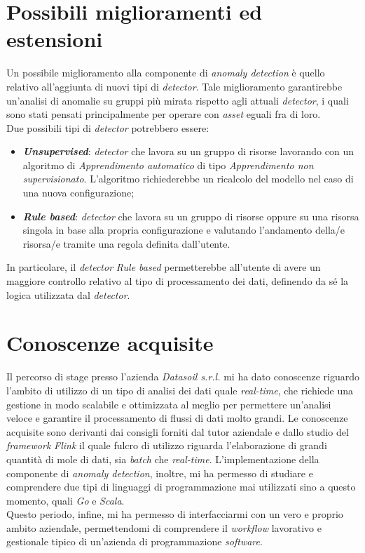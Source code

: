 \section{Possibili miglioramenti ed estensioni}
Un possibile miglioramento alla componente di \textit{anomaly detection} è quello relativo all'aggiunta di nuovi tipi di \textit{detector}. Tale miglioramento garantirebbe un'analisi di anomalie su gruppi più mirata rispetto agli attuali \textit{detector}, i quali sono stati pensati principalmente per operare con \textit{asset} eguali fra di loro.\\
Due possibili tipi di \textit{detector} potrebbero essere:
\begin{itemize}
	\item{\textbf{\textit{Unsupervised}}: \textit{detector} che lavora su un gruppo di risorse lavorando con un algoritmo di \textit{\gls{Apprendimento automatico}} di tipo \textit{\gls{Apprendimento non supervisionato}}. L'algoritmo richiederebbe un ricalcolo del modello nel caso di una nuova configurazione;}
	\item{\textbf{\textit{Rule based}}: \textit{detector} che lavora su un gruppo di risorse oppure su una risorsa singola in base alla propria configurazione e valutando l'andamento della/e risorsa/e tramite una regola definita dall'utente.}
\end{itemize}
In particolare, il \textit{detector} \textit{Rule based} permetterebbe all'utente di avere un maggiore controllo relativo al tipo di processamento dei dati, definendo da sé la logica utilizzata dal \textit{detector}.



\section{Conoscenze acquisite}
Il percorso di stage presso l'azienda \textit{Datasoil s.r.l.} mi ha dato conoscenze riguardo l'ambito di utilizzo di un tipo di analisi dei dati quale \textit{real-time}, che richiede una gestione in modo scalabile e ottimizzata al meglio per permettere un'analisi veloce e garantire il processamento di flussi di dati molto grandi. Le conoscenze acquisite sono derivanti dai consigli forniti dal tutor aziendale e dallo studio del \textit{\textit{\gls{framework}}} \textit{Flink} il quale fulcro di utilizzo riguarda l'elaborazione di grandi quantità di mole di dati, sia \textit{batch} che \textit{real-time}. L'implementazione della componente di \textit{anomaly detection}, inoltre, mi ha permesso di studiare e comprendere due tipi di linguaggi di programmazione mai utilizzati sino a questo momento, quali \textit{Go} e \textit{Scala}.\\
Questo periodo, infine, mi ha permesso di interfacciarmi con un vero e proprio ambito aziendale, permettendomi di comprendere il \textit{workflow} lavorativo e gestionale tipico di un'azienda di programmazione \textit{software}.


